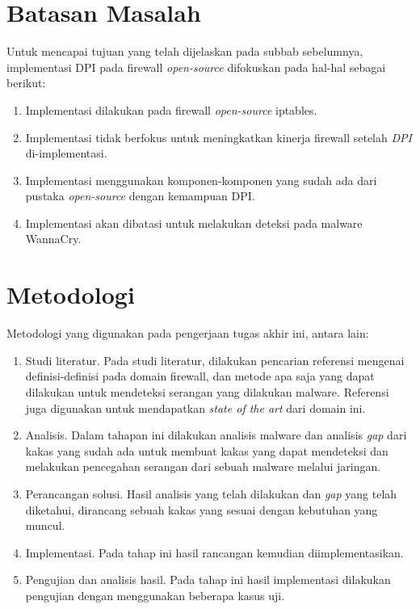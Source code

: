 \section{Batasan Masalah}

Untuk mencapai tujuan yang telah dijelaskan pada subbab sebelumnya, implementasi DPI pada firewall \textit{open-source} difokuskan pada hal-hal sebagai berikut:

\begin{enumerate}
	\item Implementasi dilakukan pada firewall \textit{open-source} iptables.
	\item Implementasi tidak berfokus untuk meningkatkan kinerja firewall setelah \textit{DPI} di-implementasi.
	\item Implementasi menggunakan komponen-komponen yang sudah ada dari pustaka \textit{open-source} dengan kemampuan DPI.
	\item Implementasi akan dibatasi untuk melakukan deteksi pada malware WannaCry.
\end{enumerate}

\section{Metodologi}
Metodologi yang digunakan pada pengerjaan tugas akhir ini, antara lain:
\begin{enumerate}
	\item Studi literatur. Pada studi literatur, dilakukan pencarian referensi mengenai
	definisi-definisi pada domain firewall, dan metode apa saja yang dapat 
	dilakukan untuk mendeteksi serangan yang dilakukan malware. Referensi juga
	digunakan untuk mendapatkan \textit{state of the art} dari domain ini.
	\item Analisis. Dalam tahapan ini dilakukan analisis malware dan analisis \textit{gap} dari
	kakas yang sudah ada untuk membuat kakas yang dapat mendeteksi dan melakukan pencegahan
	serangan dari sebuah malware melalui jaringan.
	\item Perancangan solusi. Hasil analisis yang telah dilakukan dan \textit{gap} yang telah diketahui,
	dirancang sebuah kakas yang sesuai dengan kebutuhan yang muncul.
	\item Implementasi. Pada tahap ini hasil rancangan kemudian diimplementasikan.
	\item Pengujian dan analisis hasil. Pada tahap ini hasil implementasi dilakukan
	pengujian dengan menggunakan beberapa kasus uji.
\end{enumerate}
